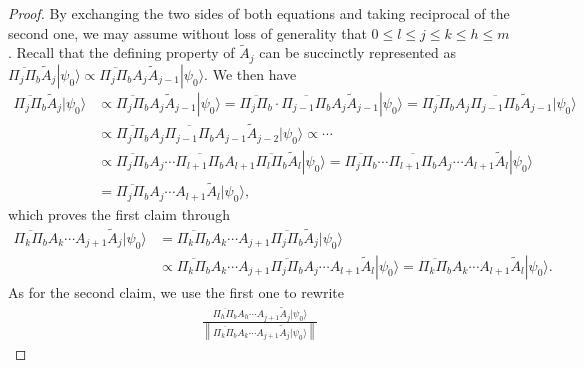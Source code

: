 \documentclass[letterpaper,onecolumn,11pt,accepted=2026-02-14]{quantumarticle}
\newcommand{\norm}[1]{\left\lVert#1\right\rVert}
\theoremstyle{remark}
\theoremstyle{plain}
\newcommand{\ket}[1]{|#1\rangle}
\begin{document}
\begin{proof}
    By exchanging the two sides of both equations and taking reciprocal of the second one, we may assume without loss of generality that $0\leq l\leq j\leq k\leq h\leq m$.
    Recall that the defining property of $\widetilde{A}_j$ can be succinctly represented as $\overline{\Pi_j\Pi_b}\widetilde{A}_j\ket{\psi_0}\propto\overline{\Pi_j\Pi_b}A_j\widetilde{A}_{j-1}\ket{\psi_0}$.
    We then have
    \begin{equation}
    \begin{aligned}
        \overline{\Pi_{j}\Pi_b}\widetilde{A}_{j}\ket{\psi_0}
        &\propto\overline{\Pi_j\Pi_b}A_j\widetilde{A}_{j-1}\ket{\psi_0}
        =\overline{\Pi_j\Pi_b}\cdot\overline{\Pi_{j-1}\Pi_b}A_j\widetilde{A}_{j-1}\ket{\psi_0}
        =\overline{\Pi_j\Pi_b}A_j\overline{\Pi_{j-1}\Pi_b}\widetilde{A}_{j-1}\ket{\psi_0}\\
        &\propto\overline{\Pi_j\Pi_b}A_j\overline{\Pi_{j-1}\Pi_b}A_{j-1}\widetilde{A}_{j-2}\ket{\psi_0}
        \propto\cdots\\
        &\propto\overline{\Pi_{j}\Pi_b}A_j\cdots \overline{\Pi_{l+1}\Pi_b}A_{l+1}
        \overline{\Pi_{l}\Pi_b}\widetilde{A}_l\ket{\psi_0}
        =\overline{\Pi_{j}\Pi_b}\cdots\overline{\Pi_{l+1}\Pi_b}A_j\cdots A_{l+1}\widetilde{A}_l\ket{\psi_0}\\
        &=\overline{\Pi_{j}\Pi_b}A_j\cdots A_{l+1}\widetilde{A}_l\ket{\psi_0},
    \end{aligned}
    \end{equation}
    which proves the first claim through
    \begin{equation}
    \begin{aligned}
        \overline{\Pi_{k}\Pi_b}A_k\cdots A_{j+1}\widetilde{A}_{j}\ket{\psi_0}
        &=\overline{\Pi_{k}\Pi_b}A_k\cdots A_{j+1}\overline{\Pi_{j}\Pi_b}\widetilde{A}_{j}\ket{\psi_0}\\
        &\propto\overline{\Pi_{k}\Pi_b}A_k\cdots A_{j+1}\overline{\Pi_{j}\Pi_b}A_j\cdots A_{l+1}\widetilde{A}_l\ket{\psi_0}
        =\overline{\Pi_{k}\Pi_b}A_k\cdots A_{l+1}\widetilde{A}_l\ket{\psi_0}.
    \end{aligned}
    \end{equation}
As for the second claim, we use the first one to rewrite
\begin{equation}
\begin{aligned}
    \frac{\overline{\Pi_{h}\Pi_b}A_{h}\cdots A_{j+1}\widetilde{A}_{j}\ket{\psi_0}}{\norm{\overline{\Pi_{k}\Pi_b}A_{k}\cdots A_{j+1}\widetilde{A}_{j}\ket{\psi_0}}}

\end{aligned}
\end{equation}
\end{proof}
\end{document}
